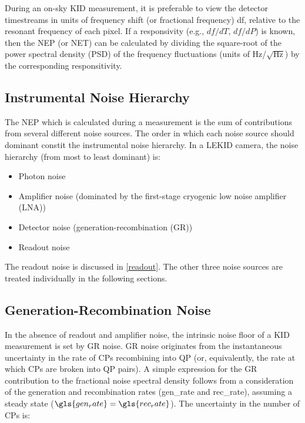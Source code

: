 During an on-sky KID measurement, it is preferable to view the detector timestreams in units of frequency shift (or fractional frequency) \gls{df}, relative to the resonant frequency of each pixel. If a responsivity (e.g., $df/dT$, $df/dP$) is known, then the NEP (or NET) can be calculated by dividing the square-root of the power spectral density (PSD) of the frequency fluctuations (units of Hz/$\sqrt{\mathrm{Hz}}$) by the corresponding responsitivity.

\subsection{Instrumental Noise Hierarchy}

The NEP which is calculated during a measurement is the sum of contributions from several different noise sources. The order in which each noise source should dominant constit the instrumental noise hierarchy. In a LEKID camera, the noise hierarchy (from most to least dominant) is:

\begin{itemize}[nosep]
  \item Photon noise
  \item Amplifier noise (dominated by the first-stage cryogenic low noise amplifier (LNA))
  \item Detector noise (generation-recombination (GR))
  \item Readout noise
\end{itemize}

The readout noise is discussed in \ref{readout}. The other three noise sources are treated individually in the following sections.

\subsection{Generation-Recombination Noise}\label{ssec:GR noise}

In the absence of readout and amplifier noise, the intrinsic noise floor of a KID measurement is set by GR noise. GR noise originates from the instantaneous uncertainty in the rate of CPs recombining into QP (or, equivalently, the rate at which CPs are broken into QP pairs). A simple expression for the GR contribution to the fractional noise spectral density follows from a consideration of the generation and recombination rates (\gls{gen_rate} and \gls{rec_rate}), assuming a steady state ($\gls{gen_rate} = \gls{rec_rate}$). The uncertainty in the number of CPs is:

